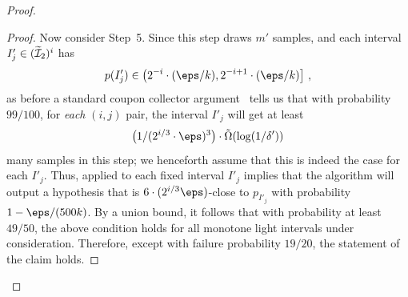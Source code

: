 \begin{proof}
\begin{proof}
{Now consider Step~5.  Since this step draws $m'$ samples, and each
  interval $I'_j \in (\widetilde{{\cal I}}_2)^i$ has 
\[
p(I'_j) \in
  \left( 2^{-i} \cdot (\eps/k), 2^{-i+1} \cdot (\eps/k) \right]\,,
\]
as before a standard coupon collector argument~\cite{NS:60} tells us that with probability $99/100$, for \emph{each} $(i,j)$ pair, the interval $I'_j$ will get at least 
\[
\bigl(1/(2^{i/3} \cdot \eps)^3\bigr) \cdot \tilde{\Omega}(\log(1/\delta'))
\]
many samples in this step; we henceforth assume that this is indeed the case for each $I'_j$.  
Thus,  applied to each fixed interval $I'_j$ implies that the algorithm }
will output a hypothesis that is ${6\cdot(2^{i/3} \eps)}$-close to $p_{I'_j}$ with probability $1-\eps/(500k)$.
By a union bound, it follows that with probability at least $49/50$,
the above condition holds for all monotone light intervals under consideration.
Therefore, except with failure probability $19/20$, the statement of the 
{claim} holds. 
\end{proof}


\end{proof}
